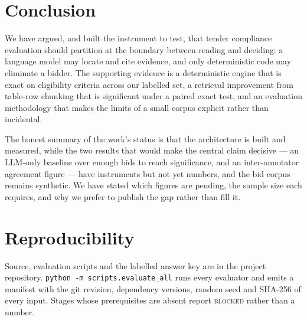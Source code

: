 \documentclass[conference]{IEEEtran}
\begin{document}
\section{Conclusion}

We have argued, and built the instrument to test, that tender compliance
evaluation should partition at the boundary between reading and deciding: a
language model may locate and cite evidence, and only deterministic code may
eliminate a bidder. The supporting evidence is a deterministic engine that is
exact on eligibility criteria across our labelled set, a retrieval improvement
from table-row chunking that is significant under a paired exact test, and an
evaluation methodology that makes the limits of a small corpus explicit rather
than incidental.

The honest summary of the work's status is that the architecture is built and
measured, while the two results that would make the central claim decisive --- an
LLM-only baseline over enough bids to reach significance, and an
inter-annotator agreement figure --- have instruments but not yet numbers, and
the bid corpus remains synthetic. We have stated which figures are pending, the
sample size each requires, and why we prefer to publish the gap rather than fill
it.

\section*{Reproducibility}

Source, evaluation scripts and the labelled answer key are in the project
repository. \texttt{python -m scripts.evaluate\_all} runs every evaluator and
emits a manifest with the git revision, dependency versions, random seed and
SHA-256 of every input. Stages whose prerequisites are absent report
\textsc{blocked} rather than a number.
\end{document}
